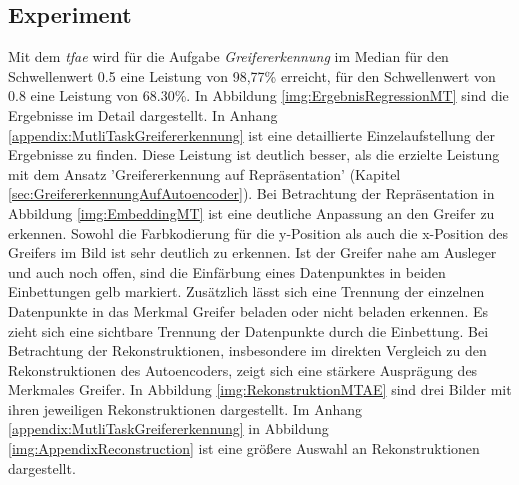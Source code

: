 	\subsection{Experiment}
	Mit dem \textit{\ac{tfae}} wird für die Aufgabe \textit{Greifererkennung} im Median für den Schwellenwert 0.5 eine Leistung von 98,77\% erreicht, für den Schwellenwert von 0.8 eine Leistung von 68.30\%. In Abbildung \ref{img:ErgebnisRegressionMT} sind die Ergebnisse im Detail dargestellt. In Anhang \ref{appendix:MutliTaskGreifererkennung} ist eine detaillierte Einzelaufstellung der Ergebnisse zu finden. Diese Leistung ist deutlich besser, als die erzielte Leistung mit dem Ansatz 'Greifererkennung auf Repräsentation' (Kapitel \ref{sec:GreifererkennungAufAutoencoder}). Bei Betrachtung der Repräsentation in Abbildung \ref{img:EmbeddingMT} ist eine deutliche Anpassung an den Greifer zu erkennen. Sowohl die Farbkodierung für die y-Position als auch die x-Position des Greifers im Bild ist sehr deutlich zu erkennen. Ist der Greifer nahe am Ausleger und auch noch offen, sind die Einfärbung eines Datenpunktes in beiden Einbettungen gelb markiert. Zusätzlich lässt sich eine Trennung der einzelnen Datenpunkte in das Merkmal Greifer beladen oder nicht beladen erkennen. Es zieht sich eine sichtbare Trennung der Datenpunkte durch die Einbettung. Bei Betrachtung der Rekonstruktionen, insbesondere im direkten Vergleich zu den Rekonstruktionen des Autoencoders, zeigt sich eine stärkere Ausprägung des Merkmales Greifer. In Abbildung \ref{img:RekonstruktionMTAE} sind drei Bilder mit ihren jeweiligen Rekonstruktionen dargestellt. Im Anhang \ref{appendix:MutliTaskGreifererkennung} in Abbildung \ref{img:AppendixReconstruction} ist eine größere Auswahl an Rekonstruktionen dargestellt.  

